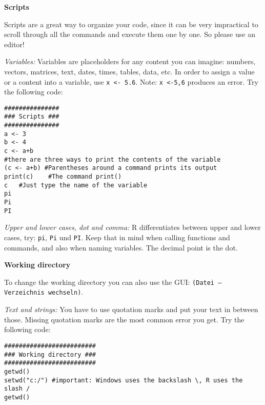 \begin{Solution}{1.2}
\textbf{Scripts}

Scripts are a great way to organize your code, since it can be very impractical to scroll through all the commands and execute them one by one. So please use an editor!

\emph{Variables:} Variables are placeholders for any content you can imagine: numbers, vectors, matrices, text, dates, times, tables, data, etc. In order to assign a value or a content into a variable, use \texttt{x <- 5.6}. Note: \texttt{x <-5,6} produces an error. Try the following code:

\begin{verbatim}
###############
### Scripts ###
###############
a <- 3
b <- 4
c <- a+b
#there are three ways to print the contents of the variable
(c <- a+b) #Parentheses around a command prints its output
print(c)   	#The command print()
c	#Just type the name of the variable
pi
Pi
PI
\end{verbatim}

\emph{Upper and lower cases, dot and comma:} R differentiates between upper and lower cases, try: \texttt{pi}, \texttt{Pi} und \texttt{PI}. Keep that in mind when calling functions and commands, and also when naming variables. The decimal point is the dot.
\end{Solution}
\begin{Solution}{1.3}
\textbf{Working directory}

To change the working directory you can also use the GUI: \texttt{(Datei -- Verzeichnis wechseln)}.

\emph{Text and strings:} You have to use quotation marks and put your text in between those. Missing quotation marks are the most common error you get. Try the following code:
\begin{verbatim}
#########################
### Working directory ###
#########################
getwd()
setwd("c:/") #important: Windows uses the backslash \, R uses the slash /
getwd()
\end{verbatim}
\end{Solution}

